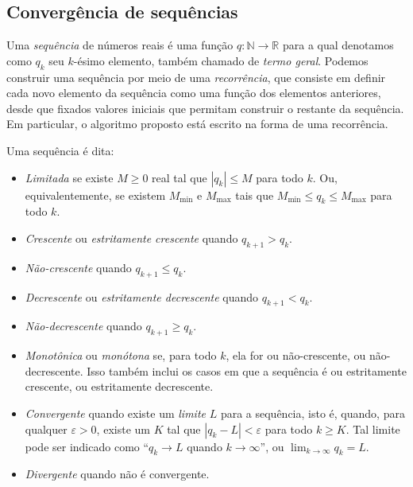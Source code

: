 \subsection*{Convergência de sequências}

Uma \emph{sequência} de números reais
é uma função $q:\mathds{N}\to\mathds{R}$
para a qual denotamos como $q_k$ seu $k$-ésimo elemento,
também chamado de \emph{termo geral}.
Podemos construir uma sequência por meio de uma \emph{recorrência},
que consiste em definir cada novo elemento da sequência
como uma função dos elementos anteriores,
desde que fixados valores iniciais
que permitam construir o restante da sequência.
Em particular, o algoritmo proposto
está escrito na forma de uma recorrência.

Uma sequência é dita:
\begin{itemize}
  \item
    \emph{Limitada} se existe $M \ge 0$ real
    tal que $|q_k| \le M$ para todo $k$.
    Ou, equivalentemente, se existem $M_{\min}$ e $M_{\max}$
    tais que  $M_{\min} \le q_k \le M_{\max}$ para todo $k$.
  \item
    \emph{Crescente} ou \emph{estritamente crescente}
    quando $q_{k+1} > q_k$.
  \item
    \emph{Não-crescente} quando $q_{k+1} \le q_k$.
  \item
    \emph{Decrescente} ou \emph{estritamente decrescente}
    quando $q_{k+1} < q_k$.
  \item
    \emph{Não-decrescente} quando $q_{k+1} \ge q_k$.
  \item
    \emph{Monotônica} ou \emph{monótona} se, para todo $k$,
    ela for ou não-crescente, ou não-decrescente.
    Isso também inclui os casos
    em que a sequência é ou estritamente crescente,
    ou estritamente decrescente.
  \item
    \emph{Convergente} quando
    existe um \emph{limite} $L$ para a sequência,
    isto é, quando,
    para qualquer $\varepsilon > 0$,
    existe um $K$ tal que $|q_k - L| < \varepsilon$
    para todo $k \ge K$.
    Tal limite pode ser indicado como
    ``$q_k \to L$ quando $k \to \infty$'',
    ou $\displaystyle \lim_{k\to\infty} q_k = L$.
  \item
    \emph{Divergente} quando não é convergente.
\end{itemize}

